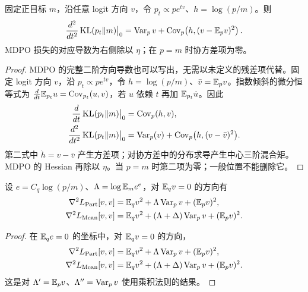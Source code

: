 \begin{proposition}
固定正目标 $m$，沿任意 logit 方向 $v$，令 $p_t\propto pe^{tv}$、$h=\log(p/m)$。则
\begin{equation}
\frac{d^2}{dt^2}\operatorname{KL}(p_t\Vert m)\big|_0
=\operatorname{Var}_pv+\operatorname{Cov}_p\!\left(h,(v-\mathbb E_pv)^2\right).
\end{equation}
MDPO 损失的对应导数为右侧除以 $\eta$；在 $p=m$ 时协方差项为零。
\end{proposition}
\begin{proof}
MDPO 的完整二阶方向导数也可以写出，无需以未定义的残差项代替。固定 logit 方向 $v$，沿 $p_t\propto p e^{tv}$，令 $h=\log(p/m)$、$\bar v=\mathbb E_pv$。指数倾斜的微分恒等式为 $\frac d{dt}\mathbb E_{p_t}u=\operatorname{Cov}_{p_t}(u,v)$，若 $u$ 依赖 $t$ 再加 $\mathbb E_{p_t}\dot u$。因此
\begin{align}
\frac d{dt}\operatorname{KL}(p_t\Vert m)\big|_0&=\operatorname{Cov}_p(h,v),\\
\frac{d^2}{dt^2}\operatorname{KL}(p_t\Vert m)\big|_0
&=\operatorname{Var}_p(v)+\operatorname{Cov}_p\bigl(h,(v-\bar v)^2\bigr).
\label{eq:mdpo-hessian}
\end{align}
第二式中 $\dot h=v-\bar v$ 产生方差项；对协方差中的分布求导产生中心三阶混合矩。MDPO 的 Hessian 再除以 $\eta$。当 $p=m$ 时第二项为零；一般位置不能删除它。
\end{proof}

\begin{corollary}[中心化坐标中的回归曲率]
设 $e=C_q\log(p/m)$、$\Lambda=\log\mathbb E_me^e$，对 $\mathbb E_qv=0$ 的方向有
\begin{align}
\nabla^2L_{\rm Part}[v,v]&=\mathbb E_qv^2+\Lambda\operatorname{Var}_pv+(\mathbb E_pv)^2,\\
\nabla^2L_{\rm Mean}[v,v]&=\mathbb E_qv^2+(\Lambda+\Delta)\operatorname{Var}_pv+(\mathbb E_pv)^2.
\end{align}
\end{corollary}
\begin{proof}
在 $\mathbb E_qe=0$ 的坐标中，对 $\mathbb E_qv=0$ 的方向，
\begin{align}
\nabla^2 L_{\rm Part}[v,v]&=\mathbb E_qv^2+\Lambda\operatorname{Var}_pv+(\mathbb E_pv)^2,\\
\nabla^2 L_{\rm Mean}[v,v]&=\mathbb E_qv^2+(\Lambda+\Delta)\operatorname{Var}_pv+(\mathbb E_pv)^2.
\end{align}
这是对 $\Lambda'=\mathbb E_pv$、$\Lambda''=\operatorname{Var}_pv$ 使用乘积法则的结果。
\end{proof}

